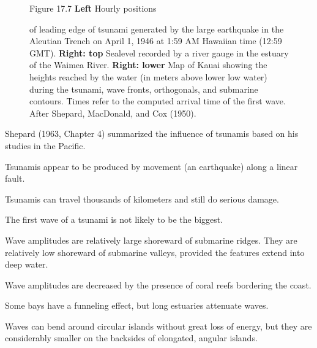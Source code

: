 \begin{figure}[t!]
\footnotesize
Figure 17.7 \textbf{Left} Hourly positions \rule{0mm}{3ex}of leading
edge of tsunami generated by the large
earthquake in the Aleutian Trench on April 1, 1946 at 1:59 AM Hawaiian
time (12:59 GMT).  \textbf{Right: top} Sealevel recorded by a river
gauge in the estuary of the Waimea River.  \textbf{Right: lower} Map
of Kauai showing the heights reached by the water (in meters above
lower low water) during the tsunami, wave fronts, orthogonals, and
submarine contours. Times refer to the computed arrival time of the
first wave. After Shepard, MacDonald, and Cox (1950).
\label{fig:tsunami}
\vspace{-2ex}
\end{figure}

Shepard (1963, Chapter 4) summarized the influence of
tsunamis based on his studies in the
Pacific.
\begin{enumerate}
\vitem Tsunamis appear to be produced by movement (an earthquake)
along a linear fault.

\vitem Tsunamis can travel thousands of kilometers and still do
serious damage.

\vitem The first wave of a tsunami is not likely to be the biggest.

\vitem Wave amplitudes are relatively large shoreward of submarine
ridges. They are relatively low shoreward of submarine valleys,
provided the features extend into deep water.

\vitem Wave amplitudes are decreased by the presence of coral reefs
bordering the coast.

\vitem Some bays have a funneling effect, but long estuaries attenuate
waves.

\vitem Waves can bend around circular islands without great loss of
energy, but they are considerably smaller on the backsides of
elongated, angular islands.
\end{enumerate}


